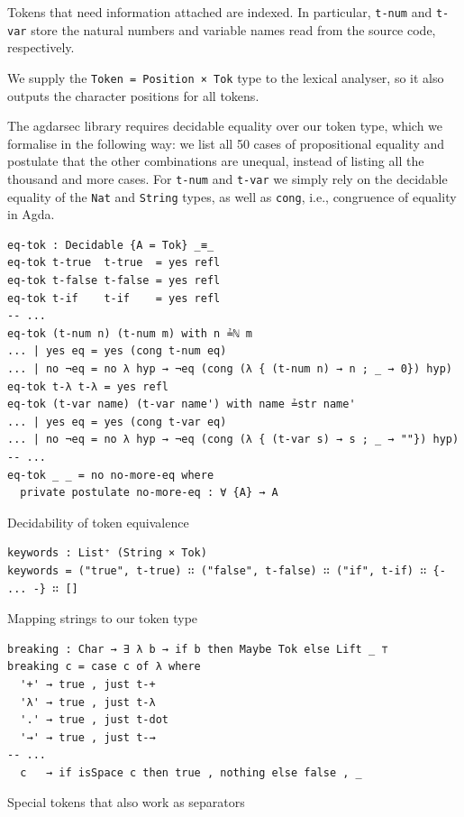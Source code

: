 Tokens that need information attached are indexed. In particular, \verb$t-num$ and \verb$t-var$ store the natural numbers and variable names read from the source code, respectively.

We supply the \verb$Token = Position × Tok$ type to the lexical analyser, so it also outputs the character positions for all tokens.

The agdarsec library requires decidable equality over our token type, which we formalise in the following way: we list all 50 cases of propositional equality and postulate that the other combinations are unequal, instead of listing all the thousand and more cases. For \verb$t-num$ and \verb$t-var$ we simply rely on the decidable equality of the \verb$Nat$ and \verb$String$ types, as well as \verb$cong$, i.e., congruence of equality in Agda.

\begin{listing}[H]
\begin{verbatim}
eq-tok : Decidable {A = Tok} _≡_
eq-tok t-true  t-true  = yes refl
eq-tok t-false t-false = yes refl
eq-tok t-if    t-if    = yes refl
-- ...
eq-tok (t-num n) (t-num m) with n ≟ℕ m
... | yes eq = yes (cong t-num eq)
... | no ¬eq = no λ hyp → ¬eq (cong (λ { (t-num n) → n ; _ → 0}) hyp)
eq-tok t-λ t-λ = yes refl
eq-tok (t-var name) (t-var name') with name ≟str name'
... | yes eq = yes (cong t-var eq)
... | no ¬eq = no λ hyp → ¬eq (cong (λ { (t-var s) → s ; _ → ""}) hyp)
-- ...
eq-tok _ _ = no no-more-eq where
  private postulate no-more-eq : ∀ {A} → A
\end{verbatim}
\caption{Decidability of token equivalence}
\label{code:lex-tok-eq}
\end{listing}

\begin{listing}[H]
\begin{verbatim}
keywords : List⁺ (String × Tok)
keywords = ("true", t-true) ∷ ("false", t-false) ∷ ("if", t-if) ∷ {- ... -} ∷ []
\end{verbatim}
\caption{Mapping strings to our token type}
\label{code:lex-keywords}
\end{listing}

\begin{listing}[H]
\begin{verbatim}
breaking : Char → ∃ λ b → if b then Maybe Tok else Lift _ ⊤
breaking c = case c of λ where
  '+' → true , just t-+
  'λ' → true , just t-λ
  '.' → true , just t-dot
  '→' → true , just t-→
-- ...
  c   → if isSpace c then true , nothing else false , _
\end{verbatim}
\caption{Special tokens that also work as separators}
\label{code:lex-breaking}
\end{listing}

